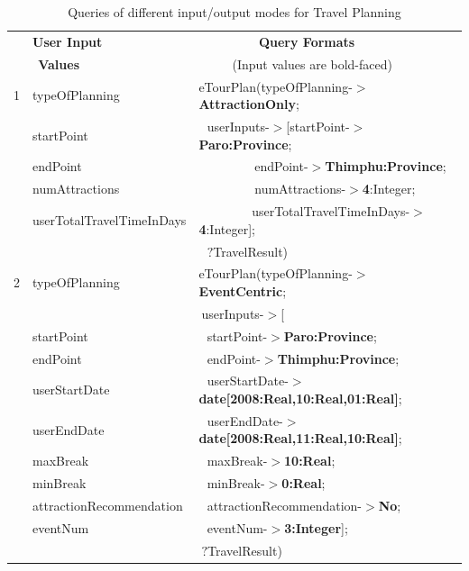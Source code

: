 \documentclass[a4paper,9pt]{beamer}
\begin{document}
{\begin{table} [tbph]
\centering
\scriptsize
\begin{tabular}{|l|l|l|}
\hline
 &\textbf{User Input} &$~~~~~~~~~~~~~~~~~~~~$ \textbf{Query Formats} \\
 &$~~$\textbf{Values}   & $~~~~~~~~~~~~$(Input values are bold-faced)   \\
\hline
 1&typeOfPlanning &eTourPlan(typeOfPlanning-$>${\color{blue}\textbf{AttractionOnly}};\\
  &startPoint     &$~~~$userInputs-$>$[startPoint-$>${\color{blue}\textbf{Paro:Province}}; \\
  &endPoint         &$~~~~~~~~~~~~~~~~~~~~$endPoint-$>${\color{blue}\textbf{Thimphu:Province}}; \\
  &numAttractions   &$~~~~~~~~~~~~~~~~~~~~$numAttractions-$>${\color{blue}\textbf{4}:Integer};\\ &userTotalTravelTimeInDays&$~~~~~~~~~~~~~~~~~~~$userTotalTravelTimeInDays-$>${\color{blue}\textbf{4}:Integer}];\\
  &                       &$~~~${\color{red}$?$TravelResult}) \\        
\hline
2&typeOfPlanning & eTourPlan(typeOfPlanning-$>${\color{blue}\textbf{EventCentric}};\\
   &                        &$~$userInputs-$>$[\\
   &startPoint          &$~~~$startPoint-$>${\color{blue}\textbf{Paro:Province}}; \\
  &endPoint       &$~~~$endPoint-$>${\color{blue}\textbf{Thimphu:Province}}; \\
  &userStartDate  &$~~~$userStartDate-$>${\color{blue}\textbf{date[2008:Real,10:Real,01:Real]}}; \\
  &userEndDate    &$~~~$userEndDate-$>${\color{blue}\textbf{date[2008:Real,11:Real,10:Real]}}; \\
  &maxBreak       &$~~~$maxBreak-$>${\color{blue}\textbf{10:Real}}; \\
  &minBreak       &$~~~$minBreak-$>${\color{blue}\textbf{0:Real}}; \\
  &attractionRecommendation&$~~~$attractionRecommendation-$>${\color{blue}\textbf{No}}; \\
  &eventNum      &$~~~$eventNum-$>${\color{blue}\textbf{3:Integer}}]; \\
  &                      &$~${\color{red}$?$TravelResult})\\         
\hline
\end{tabular} 
\caption{Queries of different input/output modes for Travel Planning}
\end{table}
}
\end{document}
